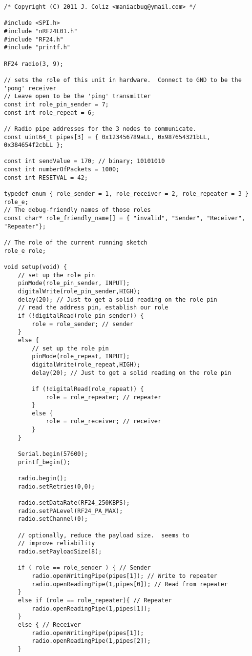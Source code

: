 \begin{lstlisting}
/* Copyright (C) 2011 J. Coliz <maniacbug@ymail.com> */

#include <SPI.h>
#include "nRF24L01.h"
#include "RF24.h"
#include "printf.h"

RF24 radio(3, 9);

// sets the role of this unit in hardware.  Connect to GND to be the 'pong' receiver
// Leave open to be the 'ping' transmitter
const int role_pin_sender = 7;
const int role_repeat = 6;

// Radio pipe addresses for the 3 nodes to communicate.
const uint64_t pipes[3] = { 0x123456789aLL, 0x987654321bLL, 0x384654f2cbLL };

const int sendValue = 170; // binary; 10101010
const int numberOfPackets = 1000;
const int RESETVAL = 42;

typedef enum { role_sender = 1, role_receiver = 2, role_repeater = 3 } role_e;
// The debug-friendly names of those roles
const char* role_friendly_name[] = { "invalid", "Sender", "Receiver", "Repeater"};

// The role of the current running sketch
role_e role;

void setup(void) {
    // set up the role pin
    pinMode(role_pin_sender, INPUT);
    digitalWrite(role_pin_sender,HIGH);
    delay(20); // Just to get a solid reading on the role pin
    // read the address pin, establish our role
    if (!digitalRead(role_pin_sender)) {
        role = role_sender; // sender        
    }
    else {
        // set up the role pin
        pinMode(role_repeat, INPUT);
        digitalWrite(role_repeat,HIGH);
        delay(20); // Just to get a solid reading on the role pin

        if (!digitalRead(role_repeat)) {
            role = role_repeater; // repeater
        }
        else {
            role = role_receiver; // receiver
        }
    }

    Serial.begin(57600);
    printf_begin();

    radio.begin();
    radio.setRetries(0,0);

    radio.setDataRate(RF24_250KBPS);
    radio.setPALevel(RF24_PA_MAX);
    radio.setChannel(0);

    // optionally, reduce the payload size.  seems to
    // improve reliability
    radio.setPayloadSize(8);

    if ( role == role_sender ) { // Sender
        radio.openWritingPipe(pipes[1]); // Write to repeater
        radio.openReadingPipe(1,pipes[0]); // Read from repeater
    }
    else if (role == role_repeater){ // Repeater
        radio.openReadingPipe(1,pipes[1]);
    }
    else { // Receiver
        radio.openWritingPipe(pipes[1]);
        radio.openReadingPipe(1,pipes[2]);
    }


\end{lstlisting}
